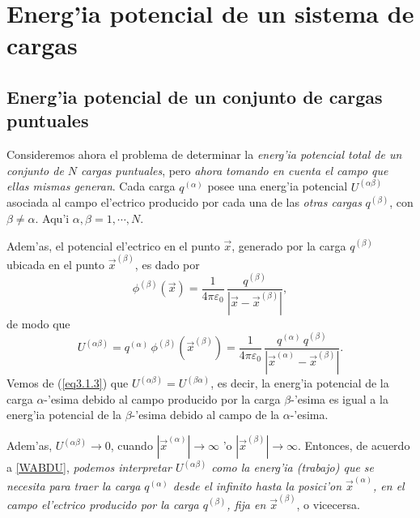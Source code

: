 \section{Energ'ia potencial de un sistema de cargas}  \label{ed3_1}

\subsection{Energ'ia potencial de un conjunto de cargas puntuales}
\label{ed3_1_1}

Consideremos ahora el problema de determinar la \textit{energ'ia potencial total de un
conjunto de $N$ cargas puntuales}, pero \textit{ahora tomando en cuenta el campo que ellas mismas generan}. Cada carga $q^{(\alpha)}$ posee una energ'ia
potencial $U^{(\alpha\beta)}$ asociada al campo el'ectrico producido por cada una de las \textit{otras cargas}  $q^{(\beta)}$, con $\beta\ne \alpha$. Aqu'i $\alpha,\beta=1,\cdots, N$.

Adem'as, el potencial el'ectrico en el punto $\vec{x}$, generado por la carga $q^{(\beta)}$
ubicada en el punto $\vec{x}^{(\beta)}$, es dado por
\begin{equation}
\phi^{(\beta)}(\vec{x})=\frac{1}{4\pi\varepsilon_0}\,\frac{q^{(\beta)}}{|\vec{x}
-\vec{x}^{(\beta)}|} ,
\end{equation}
de modo que
\begin{equation} \label{eq3.1.3}
U^{(\alpha\beta)}=q^{(\alpha)}\,\phi^{(\beta)}(\vec{x}^{(\beta)})=\frac{1}{4\pi\varepsilon_0}\,\frac{q^{(\alpha)}\,q^{(\beta)}}{|\vec{x}^{(\alpha)}-\vec{x}^{(\beta)}|}.
\end{equation}
Vemos de (\ref{eq3.1.3}) que $U^{(\alpha\beta)}=U^{(\beta\alpha)}$, es decir, la energ'ia potencial de la carga $\alpha$-'esima debido al campo producido por la carga
$\beta$-'esima es igual a la energ'ia potencial de la $\beta$-'esima debido al campo
de la $\alpha$-'esima.

Adem'as,  $U^{(\alpha\beta)}\to 0$, cuando  $|\vec{x}^{(\alpha)}|\to\infty$
'o $|\vec{x}^{(\beta)}|\to\infty$. Entonces, de acuerdo a \eqref{WABDU}, \textit{podemos interpretar $U^{(\alpha\beta)}$ como la energ'ia (trabajo) que se necesita para traer la carga
$q^{(\alpha)}$ desde el infinito hasta la posici'on $\vec{x}^{(\alpha)}$, en el campo
el'ectrico producido por la carga $q^{(\beta)}$, fija en $\vec{x}^{(\beta)}$}, o
vicecersa.

